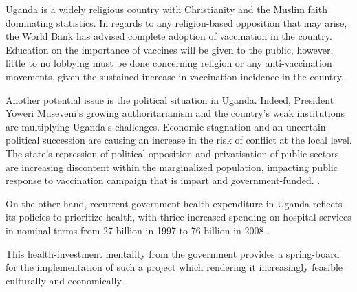 Uganda is a widely religious country with Christianity and the Muslim faith dominating statistics. In regards to any religion-based opposition that may arise, the World Bank has advised complete adoption of vaccination in the country. Education on the importance of vaccines will be given to the public, however, little to no lobbying must be done concerning religion or any anti-vaccination movements, given the sustained increase in vaccination incidence in the country. \cite{WB:2016, WB:2018} 

Another potential issue is the political situation in Uganda. Indeed, President Yoweri Museveni's growing authoritarianism and the country’s weak institutions are multiplying Uganda’s challenges. Economic stagnation and an uncertain political succession are causing an increase in the risk of conflict at the local level. The state’s repression of political opposition and privatisation of public sectors are increasing discontent within the marginalized population, impacting public response to vaccination campaign that is impart and government-funded. \cite{CrisisGroup2012}. 

On the other hand, recurrent government health expenditure in Uganda reflects its policies to prioritize health, with thrice increased spending on hospital services in nominal terms from 27 billion in 1997 to 76 billion in 2008 \cite{MugishaFrederick2010Twed}. 

This health-investment mentality from the government provides a spring-board for the implementation of such a project which rendering it increasingly feasible culturally and economically. 